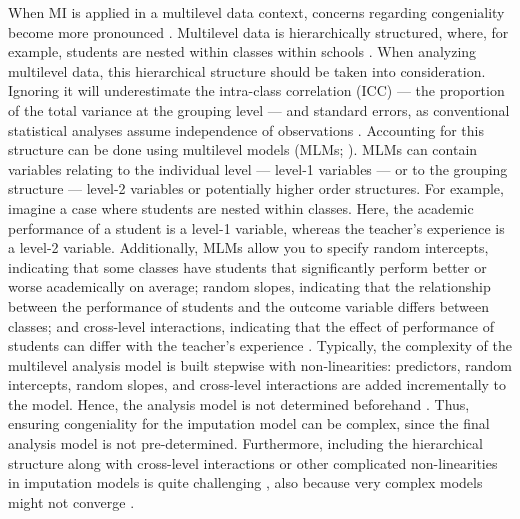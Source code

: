 \documentclass[3p,12pt,a4paper]{elsarticle}
\begin{document}
When MI is applied in a multilevel data context, concerns regarding congeniality become more pronounced \citep{mistlerComparisonJointModel2017, enders2018, enders2018a, enders2020, buurenFlexibleImputationMissing2018, taljaard2008, enders2016, resche-rigon2018, audigier2018, dong2023, grund2016, grund2018a, grund2018, ludtke2017, grund2021, quartagno2022}. Multilevel data is hierarchically structured, where, for example, students are nested within classes within schools \citep{hox2017, hox2011}. When analyzing multilevel data, this hierarchical structure should be taken into consideration. Ignoring it will underestimate the intra-class correlation (ICC) --- the proportion of the total variance at the grouping level \citep{gulliford2005, shieh2012, hox2011} --- and standard errors, as conventional statistical analyses assume independence of observations \citep{buurenFlexibleImputationMissing2018, ludtke2017, taljaard2008, hox2011}. Accounting for this structure can be done using multilevel models (MLMs; ). MLMs can contain variables relating to the individual level --- level-1 variables --- or to the grouping structure --- level-2 variables or potentially higher order structures. For example, imagine a case where students are nested within classes. Here, the academic performance of a student is a level-1 variable, whereas the teacher's experience is a level-2 variable. Additionally, MLMs allow you to specify random intercepts, indicating that some classes have students that significantly perform better or worse academically on average; random slopes, indicating that the relationship between the performance of students and the outcome variable differs between classes; and cross-level interactions, indicating that the effect of performance of students can differ with the teacher's experience \citep{hox2017, hox2011}. Typically, the complexity of the multilevel analysis model is built stepwise with non-linearities: predictors, random intercepts, random slopes, and cross-level interactions are added incrementally to the model. Hence, the analysis model is not determined beforehand \citep{hox2017, hox2011}. Thus, ensuring congeniality for the imputation model can be complex, since the final analysis model is not pre-determined. Furthermore, including the hierarchical structure along with cross-level interactions or other complicated non-linearities in imputation models is quite challenging \citep{buurenFlexibleImputationMissing2018, burgette2010, hox2011}, also because very complex models might not converge \citep{buurenFlexibleImputationMissing2018}.
\end{document}
